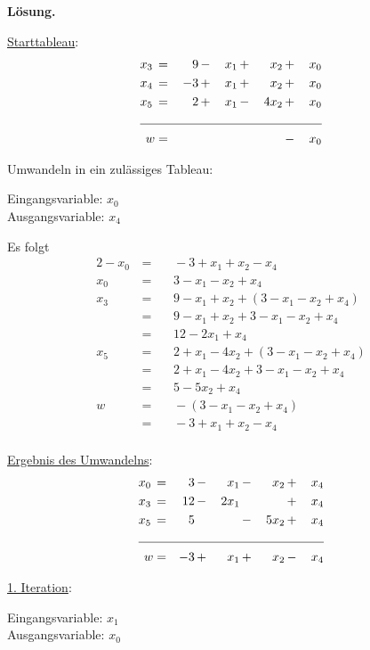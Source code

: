 \documentclass[10pt,a4paper,oneside,ngerman,numbers=noenddot]{scrartcl}
\begin{document}
		\textbf{Lösung.}
		
		\underline{Starttableau}:
		\begin{alignat*}{5}
			x_{3} \,&=&\, 9 \,&-&\, x_{1} \,&+&\, x_{2} \,&+&\, x_{0} \\
			x_{4} \,&=&\, -3 \,&+&\, x_{1} \,&+&\, x_{2} \,&+&\, x_{0} \\
			x_{5} \,&=&\, 2 \,&+&\, x_{1} \,&-&\, 4x_{2} \,&+&\, x_{0} \\ \cline{1 - 9}
			w &=& && && \,&-&\, x_{0}
		\end{alignat*}
		
		Umwandeln in ein zulässiges Tableau:
				
		Eingangsvariable: $x_{0}$\\
		Ausgangsvariable: $x_{4}$
		
		Es folgt
		\begin{alignat*}{2}
			-x_{0} \,&=&&\, -3 + x_{1} + x_{2} - x_{4} \\
			x_{0} \,&=&&\, 3 - x_{1} - x_{2} + x_{4} \\			
			x_{3} \,&=&&\, 9 - x_{1} + x_{2} + \left(3 - x_{1} - x_{2} + x_{4}\right) \\			
			&=&&\, 9 - x_{1} + x_{2} + 3 - x_{1} - x_{2} + x_{4} \\
			&=&&\, 12 - 2x_{1} + x_{4} \\
			x_{5} \,&=&&\, 2 + x_{1} - 4x_{2} + \left(3 - x_{1} - x_{2} + x_{4}\right) \\
			&=&&\, 2 + x_{1} - 4x_{2} + 3 - x_{1} - x_{2} + x_{4} \\
			&=&&\, 5 - 5x_{2} + x_{4} \\
			w \,&=&&\, -\left(3 - x_{1} - x_{2} + x_{4}\right) \\
			&=&&\, -3 + x_{1} + x_{2} - x_{4} \\
		\end{alignat*}
		
		\underline{Ergebnis des Umwandelns}:
		\begin{alignat*}{5}
			x_{0} \,&=&\, 3 \,&-&\, x_{1} \,&-&\, x_{2} \,&+&\, x_{4} \\
			x_{3} \,&=&\, 12 \,&-&\, 2x_{1} \,&& &+&\, x_{4} \\
			x_{5} \,&=&\, 5 \,&& &-&\, 5x_{2} \,&+&\, x_{4} \\ \cline{1 - 9}
			w &=& -3 \,&+&\, x_{1} \,&+&\, x_{2} \,&-&\, x_{4}
		\end{alignat*}
		
		\underline{1. Iteration}:
		
		Eingangsvariable: $x_{1}$ \\
		Ausgangsvariable: $x_{0}$
		
\end{document}
